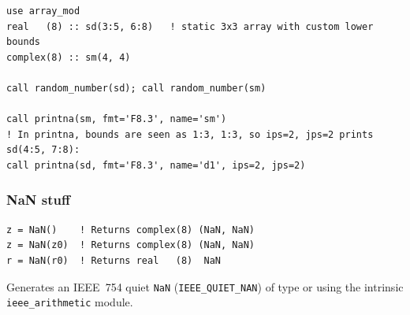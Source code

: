 \begin{description}[leftmargin=2.2cm, style=nextline]
\end{description}

\lstset{language=[95]Fortran}
\begin{lstlisting}
use array_mod
real   (8) :: sd(3:5, 6:8)   ! static 3x3 array with custom lower bounds
complex(8) :: sm(4, 4)

call random_number(sd); call random_number(sm)

call printna(sm, fmt='F8.3', name='sm')
! In printna, bounds are seen as 1:3, 1:3, so ips=2, jps=2 prints sd(4:5, 7:8):
call printna(sd, fmt='F8.3', name='d1', ips=2, jps=2)
\end{lstlisting}

\subsubsection{NaN stuff}
\label{subsubsec:nan_stuff}


\lstset{language=[95]Fortran}
\begin{lstlisting}
z = NaN()    ! Returns complex(8) (NaN, NaN)
z = NaN(z0)  ! Returns complex(8) (NaN, NaN)
r = NaN(r0)  ! Returns real   (8)  NaN
\end{lstlisting}

Generates an IEEE~754 quiet \texttt{NaN} (\texttt{IEEE\_QUIET\_NAN}) of type  or  using the intrinsic \texttt{ieee\_arithmetic} module.

